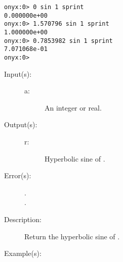 \begin{description}
\begin{description}
\begin{verbatim}
onyx:0> 0 sin 1 sprint
0.000000e+00
onyx:0> 1.570796 sin 1 sprint
1.000000e+00
onyx:0> 0.7853982 sin 1 sprint
7.071068e-01
onyx:0>
		\end{verbatim}
	\end{description}
\label{systemdict:sinh}
\item[{\onyxop{a}{sinh}{r}}: ]
	\begin{description}\item[]
	\item[Input(s): ]
		\begin{description}\item[]
		\item[a: ]
			An integer or real.
		\end{description}
	\item[Output(s): ]
		\begin{description}\item[]
		\item[r: ]
			Hyperbolic sine of .
		\end{description}
	\item[Error(s): ]
		\begin{description}\item[]
		\item[.]
		\item[.]
		\end{description}
	\item[Description: ]
		Return the hyperbolic sine of .
	\item[Example(s): ]\begin{verbatim}


\end{verbatim}
\end{description}
\end{description}
